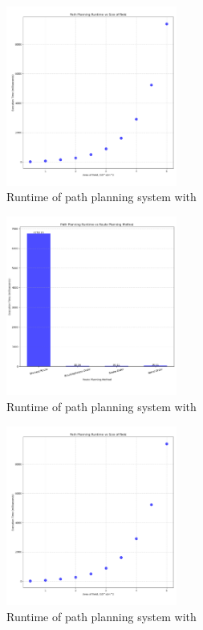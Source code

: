 \documentclass[final]{cmpreport_02}
\begin{document}
\begin{figure}[h!]
	\centering
	\includegraphics[width=0.5\textwidth]{./images/pathingSizeRt.png}
	\caption{Runtime of path planning system with }
	\label{PE:p:SizeRT}
\end{figure}


\begin{figure}[h!]
	\centering
	\includegraphics[width=0.5\textwidth]{./images/pathingRoutePlanningRT.png}
	\caption{Runtime of path planning system with }
	\label{PE:p:RoutePlanningRT}
\end{figure}


\begin{figure}[h!]
	\centering
	\includegraphics[width=0.5\textwidth]{./images/pathingSizeRt.png}
	\caption{Runtime of path planning system with }
	\label{PE:}
\end{figure}
\end{document}

